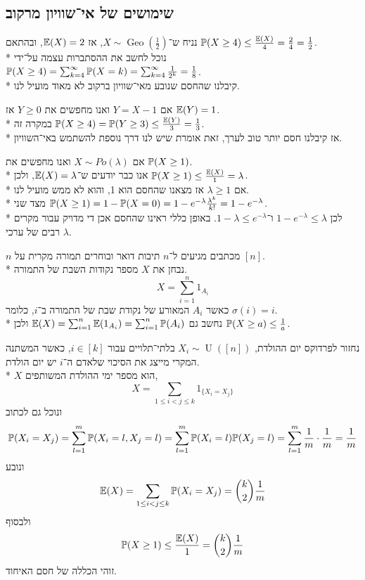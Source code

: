 \subsection{שימושים של אי־שוויון מרקוב}
\begin{example}
	נניח ש־$X \sim \operatorname{Geo}(\frac{1}{2})$, אז $\mathbb{E}(X) = 2$, ובהתאם $\mathbb{P}(X \ge 4) \le \frac{\mathbb{E}(X)}{4} = \frac{2}{4} = \frac{1}{2}$. \\*
	נוכל לחשב את ההסתברות עצמה על־ידי $\mathbb{P}(X \ge 4) = \sum_{k = 4}^{\infty} \mathbb{P}(X = k) = \sum_{k = 4}^{\infty} \frac{1}{2^k} = \frac{1}{8}$. \\*
	קיבלנו שהחסם שנובע מאי־שוויון ברקוב לא מאוד מועיל לנו.

	אם $Y = X - 1$ ואנו מחפשים את $Y \ge 0$ אז $\mathbb{E}(Y) = 1$. \\*
	במקרה זה $\mathbb{P}(X \ge 4) = \mathbb{P}(Y \ge 3) \le \frac{\mathbb{E}(Y)}{3} = \frac{1}{3}$. \\*
	אז קיבלנו חסם יותר טוב לערך, זאת אומרת שיש לנו דרך נוספת להשתמש באי־השוויון.
\end{example}
\begin{example}
	אם $X \sim Po(\lambda)$ ואנו מחפשים את $\mathbb{P}(X \ge 1)$. \\*
	אנו כבר יודעים ש־$\mathbb{E}(X) = \lambda$, ולכן $\mathbb{P}(X \ge 1) \le \frac{\mathbb{E}(X)}{1} = \lambda$. \\*
	אם $\lambda \ge 1$ אז מצאנו שהחסם הוא 1, והוא לא ממש מועיל לנו. \\*
	מצד שני $\mathbb{P}(X \ge 1) = 1 - \mathbb{P}(X = 0) = 1 - e^{-\lambda} \frac{\lambda^k}{k!} = 1 - e^{-\lambda}$. \\*
	לכן $1 - e^{-\lambda} \le \lambda$ ו־$1 - \lambda \le e^{-\lambda}$.
	באופן כללי ראינו שהחסם אכן די מדויק עבור מקרים רבים של ערכי $\lambda$.
\end{example}
\begin{example}
	$n$ מכתבים מגיעים ל־$n$ תיבות דואר ובוחרים תמורה מקרית על $[n]$. \\*
	נבחן את $X$ מספר נקודות השבת של התמורה.
	\[
		X = \sum_{i = 1}^{n} 1_{A_i}
	\]
	כאשר $A_i$ המאורע של נקודת שבת של התמורה ב־$i$, כלומר $\sigma(i) = i$. \\*
	נחשב גם $\mathbb{E}(X) = \sum_{i = 1}^{n} \mathbb{E}(1_{A_i}) = \sum_{i = 1}^{n} \mathbb{P}(A_i)$ ולכן $\mathbb{P}(X \ge a) \le \frac{1}{a}$.
\end{example}
\begin{example}
	נחזור לפרדוקס יום ההולדת, $X_i \sim \operatorname{U}([n])$ בלתי־תלויים עבור $i \in [k]$, כאשר המשתנה המקרי מייצג את הסיכוי שלאדם ה־$i$ יש יום הולדת. \\*
	$X$ הוא מספר ימי ההולדת המשותפים,
	\[
		X = \sum_{1 \le i < j \le k} 1_{\{X_i = X_j\}}
	\]
	ונוכל גם לכתוב
	\[
		\mathbb{P}(X_i = X_j)
		= \sum_{l = 1}^m \mathbb{P}(X_i = l, X_j = l)
		= \sum_{l = 1}^m \mathbb{P}(X_i = l) \mathbb{P}(X_j = l)
		= \sum_{l = 1}^m \frac{1}{m} \cdot \frac{1}{m}
		= \frac{1}{m}
	\]
	ונובע
	\[
		\mathbb{E}(X)
		= \sum_{1 \le i < j \le k} \mathbb{P}(X_i = X_j)
		= \binom{k}{2} \frac{1}{m}
	\]
	ולבסוף
	\[
		\mathbb{P}(X \ge 1) \le \frac{\mathbb{E}(X)}{1} = \binom{k}{2} \frac{1}{m}
	\]
	זוהי הכללה של חסם האיחוד.
\end{example}

